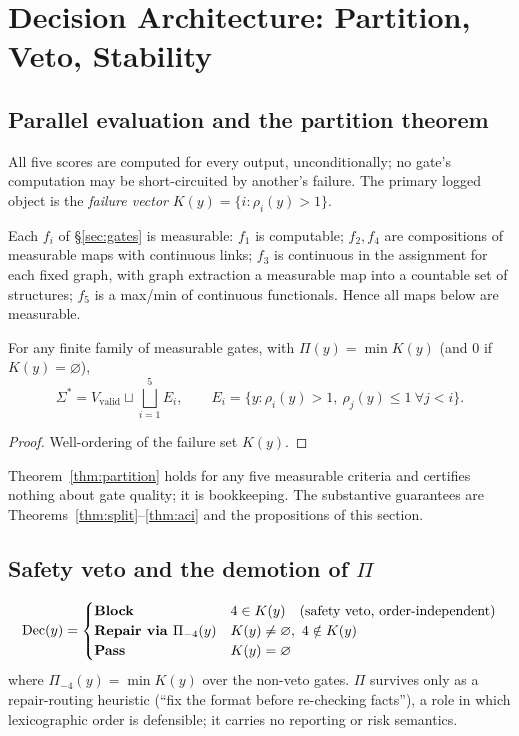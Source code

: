\section{Decision Architecture: Partition, Veto, Stability}
\label{sec:decision}

\subsection{Parallel evaluation and the partition theorem}

All five scores are computed for every output, unconditionally; no gate's
computation may be short-circuited by another's failure. The primary logged
object is the \emph{failure vector} $K(y)=\{i:\rho_i(y)>1\}$.

\begin{lemma}[Measurability]
Each $f_i$ of \S\ref{sec:gates} is measurable: $f_1$ is computable; $f_2,f_4$
are compositions of measurable maps with continuous links; $f_3$ is continuous
in the assignment for each fixed graph, with graph extraction a measurable map
into a countable set of structures; $f_5$ is a max/min of continuous
functionals. Hence all maps below are measurable.
\end{lemma}

\begin{theorem}
\label{thm:partition}
For any finite family of measurable gates, with $\Pi(y)=\min K(y)$ (and $0$ if
$K(y)=\varnothing$),
\[
\Sigma^*=V_{\mathrm{valid}}\sqcup\bigsqcup_{i=1}^5 E_i,\qquad
E_i=\{y:\rho_i(y)>1,\ \rho_j(y)\le 1\ \forall j<i\}.
\]
\end{theorem}
\begin{proof}
Well-ordering of the failure set $K(y)$.
\end{proof}

\begin{remark}[Honesty]
Theorem~\ref{thm:partition} holds for any five measurable criteria and
certifies nothing about gate quality; it is bookkeeping. The substantive
guarantees are Theorems~\ref{thm:split}--\ref{thm:aci} and the propositions of
this section.
\end{remark}

\subsection{Safety veto and the demotion of $\Pi$}
\label{sec:veto}

\[
\mathrm{Dec}(y)=
\begin{cases}
\textbf{Block} & 4\in K(y)\quad(\text{safety veto, order-independent})\\
\textbf{Repair via }\Pi_{-4}(y) & K(y)\ne\varnothing,\ 4\notin K(y)\\
\textbf{Pass} & K(y)=\varnothing
\end{cases}
\]
where $\Pi_{-4}(y)=\min K(y)$ over the non-veto gates. $\Pi$ survives only as
a repair-routing heuristic (``fix the format before re-checking facts''), a
role in which lexicographic order is defensible; it carries no reporting or
risk semantics.

